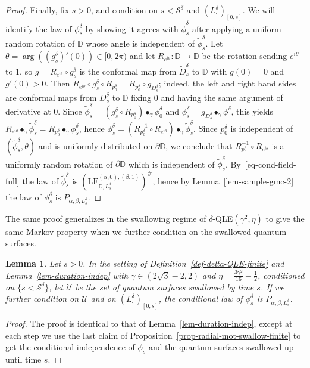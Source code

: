 \documentclass[a4paper]{article}
\numberwithin{equation}{section}
\newcommand{\D}{\mathbb{D}}
\newcommand{\qduration}{\mathcal{S}}
\newcommand{\LF}{\mathrm{LF}}
\newtheorem{lemma}[theorem]{Lemma}
\theoremstyle{remark}
\numberwithin{equation}{section}
\begin{document}
\begin{proof}
    Finally, fix $s > 0$, and condition on $s< \qduration^\delta$ and $(L_\cdot^\delta)_{[0, s]}$. We will identify the law of $\phi^\delta_s$ by showing it agrees with $\tilde \phi_s^\delta$ after applying a uniform random rotation of $\D$ whose angle is independent of $\tilde \phi_s^\delta$. Let $\theta = \arg((g^\delta_s)'(0)) \in [0,2\pi)$ and let $R_{e^{i\theta}}: \D \to \D$ be the rotation sending $e^{i\theta}$ to 1, so $g = R_{e^{i\theta}} \circ g^\delta_s$ is the  conformal map from $\tilde D^\delta_s$ to $\D$ with $g(0) = 0$ and $g'(0) > 0$. Then $R_{e^{i\theta}} \circ g^\delta_s \circ R_{p^\delta_0} =  R_{p^\delta_0} \circ g_{D^\delta_s}$; indeed, the left and right hand sides are conformal maps from $D^\delta_s$ to $\D$ fixing $0$ and having the same argument of derivative at 0. Since $\tilde \phi^\delta_s = (g^\delta_s \circ R_{p^\delta_0}) \bullet_\gamma \phi^\delta_0$
 and $\phi^\delta_s = g_{D^\delta_s} \bullet_\gamma \phi^\delta$, this yields  $ R_{e^{i\theta}} \bullet_\gamma \tilde \phi^\delta_s = R_{p^\delta_0} \bullet_\gamma \phi^\delta_s$, hence $\phi^\delta_s = (R_{p_0^\delta}^{-1} \circ R_{e^{i\theta}}) \bullet_\gamma \tilde \phi^\delta_s$. Since $p^\delta_0$ is independent of $(\tilde \phi^\delta_s, \theta)$ and is uniformly distributed on $\partial \D$, we conclude that $R_{p_0^\delta}^{-1} \circ R_{e^{i\theta}}$ is a uniformly random rotation of $\partial \D$ which is independent of $\tilde \phi^\delta_s$. By~\eqref{eq-cond-field-full} the law of $\tilde \phi^\delta_s$ is $(\LF_{\D, L_s^\delta}^{(\alpha,0), (\beta, 1)})^\#$, hence by Lemma~\ref{lem-sample-gmc-2} the law of $\phi^\delta_s$ is $P_{\alpha, \beta, L^\delta_s}$.
\end{proof}

The same proof generalizes in the swallowing regime of $\delta$-QLE$(\gamma^2,\eta)$ to give the same Markov property when we further condition on the swallowed quantum surfaces.

\begin{lemma}\label{lem-swallowing-markov}
Let $s>0$. In the setting of Definition~\ref{def-delta-QLE-finite} and Lemma~\ref{lem-duration-indep}  with $\gamma \in (2\sqrt3 - 2, 2)$ and $\eta = \frac{3\gamma^2}{16} - \frac12$, 
conditioned on $\{s < \qduration^\delta\}$, let $\mathcal U$ be the set of quantum surfaces swallowed by time $s$. If we further condition on $\mathcal U$ and on $(L^\delta_\cdot)_{[0,s]}$, the conditional law of $\phi_s^\delta$ is $P_{\alpha, \beta, L_s^\delta}$.
\end{lemma}
\begin{proof}
    The proof is identical to that of Lemma~\ref{lem-duration-indep}, except at each step we use the last claim of Proposition~\ref{prop-radial-mot-swallow-finite} to get the conditional independence of $\phi_s$ and the quantum surfaces swallowed up until time $s$.
\end{proof}
\end{document}

